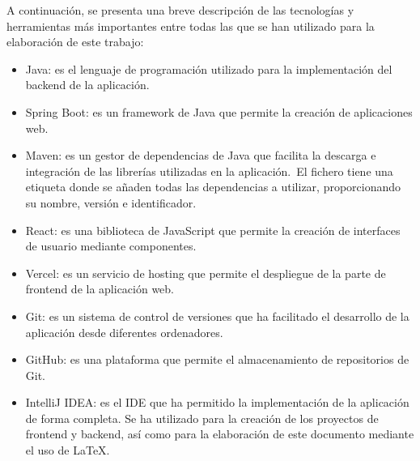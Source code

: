 A continuación, se presenta una breve descripción de las tecnologías y herramientas más importantes entre todas las que
se han utilizado para la elaboración de este trabajo:

\begin{itemize}
	\item Java: es el lenguaje de programación utilizado para la implementación del backend de la aplicación.
	\item Spring Boot: es un framework de Java que permite la creación de aplicaciones web.
	\item Maven: es un gestor de dependencias de Java que facilita la descarga e integración de las librerías
	utilizadas en la aplicación.\ El fichero  tiene una etiqueta donde se añaden todas las
	dependencias a utilizar, proporcionando su nombre, versión e identificador.
	\item React: es una biblioteca de JavaScript que permite la creación de interfaces de usuario mediante componentes.
	\item Vercel: es un servicio de hosting que permite el despliegue de la parte de frontend de la aplicación web.
	\item Git: es un sistema de control de versiones que ha facilitado el desarrollo de la aplicación desde diferentes
	ordenadores.
	\item GitHub: es una plataforma que permite el almacenamiento de repositorios de Git.
	\item IntelliJ IDEA: es el IDE que ha permitido la implementación de la aplicación de forma completa.
	Se ha utilizado para la creación de los proyectos de frontend y backend, así como para la
	elaboración de este documento mediante el uso de \LaTeX.
\end{itemize}
